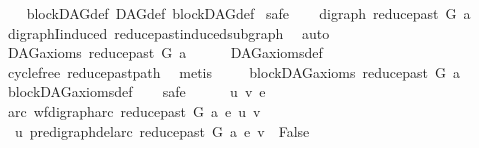 \begin{isabellebody}
%
\isadelimproof
\ \ %
\endisadelimproof
%
\isatagproof
{}\isamarkupfalse%
\ blockDAG{\isacharunderscore}{\kern0pt}def\ DAG{\isacharunderscore}{\kern0pt}def\ blockDAG{\isacharunderscore}{\kern0pt}def\isanewline
\isanewline
{}\isamarkupfalse%
\ safe\isanewline
\ \ \isamarkupfalse%
\ {\isachardoublequoteopen}digraph\ {\isacharparenleft}{\kern0pt}reduce{\isacharunderscore}{\kern0pt}past\ G\ a{\isacharparenright}{\kern0pt}{\isachardoublequoteclose}\isanewline
\ \ \ \ \isamarkupfalse%
\ digraphI{\isacharunderscore}{\kern0pt}induced\ reduce{\isacharunderscore}{\kern0pt}past{\isacharunderscore}{\kern0pt}induced{\isacharunderscore}{\kern0pt}subgraph\ \isamarkupfalse%
\ auto\ \ \isanewline
{}\isamarkupfalse%
\isanewline
\ \ \isamarkupfalse%
\ {\isachardoublequoteopen}DAG{\isacharunderscore}{\kern0pt}axioms\ {\isacharparenleft}{\kern0pt}reduce{\isacharunderscore}{\kern0pt}past\ G\ a{\isacharparenright}{\kern0pt}{\isachardoublequoteclose}\isanewline
\ \ \ \ \isamarkupfalse%
\ DAG{\isacharunderscore}{\kern0pt}axioms{\isacharunderscore}{\kern0pt}def\isanewline
\ \ \ \ \isamarkupfalse%
\ cycle{\isacharunderscore}{\kern0pt}free\ reduce{\isacharunderscore}{\kern0pt}past{\isacharunderscore}{\kern0pt}path\ \isamarkupfalse%
\ metis\ \isanewline
{}\isamarkupfalse%
\isanewline
\ \ \isamarkupfalse%
\ {\isachardoublequoteopen}blockDAG{\isacharunderscore}{\kern0pt}axioms\ {\isacharparenleft}{\kern0pt}reduce{\isacharunderscore}{\kern0pt}past\ G\ a{\isacharparenright}{\kern0pt}{\isachardoublequoteclose}\isanewline
\ \ \ \ \isamarkupfalse%
\ blockDAG{\isacharunderscore}{\kern0pt}axioms{\isacharunderscore}{\kern0pt}def\isanewline
\ \ \isamarkupfalse%
\ safe\isanewline
\ \ \ \ \isamarkupfalse%
\ u\ v\ e\ \isanewline
\ \ \ \ \isamarkupfalse%
\ arc{\isacharcolon}{\kern0pt}\ {\isachardoublequoteopen}wf{\isacharunderscore}{\kern0pt}digraph{\isachardot}{\kern0pt}arc\ {\isacharparenleft}{\kern0pt}reduce{\isacharunderscore}{\kern0pt}past\ G\ a{\isacharparenright}{\kern0pt}\ e\ {\isacharparenleft}{\kern0pt}u{\isacharcomma}{\kern0pt}\ v{\isacharparenright}{\kern0pt}{\isachardoublequoteclose}\isanewline
\ \ \ \ \isamarkupfalse%
\ \isamarkupfalse%
\ {\isachardoublequoteopen}\ u\ {\isasymrightarrow}\isactrlsup {\isacharplus}{\kern0pt}\isactrlbsub pre{\isacharunderscore}{\kern0pt}digraph{\isachardot}{\kern0pt}del{\isacharunderscore}{\kern0pt}arc\ {\isacharparenleft}{\kern0pt}reduce{\isacharunderscore}{\kern0pt}past\ G\ a{\isacharparenright}{\kern0pt}\ e\isactrlesub \ v\ {\isasymLongrightarrow}\ False\ {\isachardoublequoteclose}\isanewline

\end{isabellebody}

